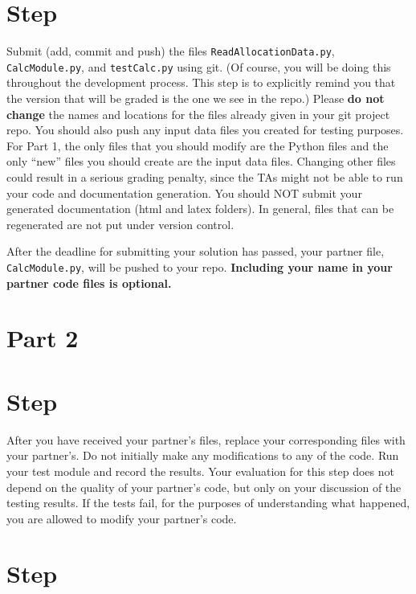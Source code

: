 \documentclass[12pt]{article}
\newcounter{stepnum}
\begin{document}
\section *{Step  \thestepnum}

Submit (add, commit and push) the files {\tt ReadAllocationData.py}, {\tt
  CalcModule.py}, and {\tt testCalc.py} using git.  (Of course, you will be
doing this throughout the development process.  This step is to explicitly
remind you that the version that will be graded is the one we see in the repo.)
Please \textbf{do not change} the names and locations for the files already
given in your git project repo.  You should also push any input data files you
created for testing purposes.  For Part 1, the only files that you should modify
are the Python files and the only ``new'' files you should create are the input
data files.  Changing other files could result in a serious grading penalty,
since the TAs might not be able to run your code and documentation generation.
You should NOT submit your generated documentation (html and latex folders).  In
general, files that can be regenerated are not put under version control.

After the deadline for submitting your solution has passed, your partner file,
{\tt CalcModule.py}, will be pushed to your repo.  \textbf{Including your name
  in your partner code files is optional.}

\section*{Part 2}

\section *{Step  \thestepnum}

After you have received your partner's files, replace your corresponding files
with your partner's.  Do not initially make any modifications to any of the
code.  Run your test module and record the results.  Your evaluation for this
step does not depend on the quality of your partner's code, but only on your
discussion of the testing results.  If the tests fail, for the purposes of
understanding what happened, you are allowed to modify your partner's code.

\section *{Step  \thestepnum \label{StepReport}} 
\end{document}
